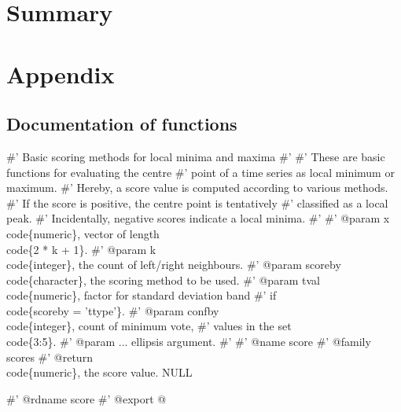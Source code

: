 \documentclass[a4paper]{article}
\begin{document}
\section{Summary}
\label{S4}

\section{Appendix}
\label{S5}

\subsection{Documentation of functions}
\label{S5SS1}

\nwenddocs{}\endmoddef
#' Basic scoring methods for local minima and maxima
#'
#' These are basic functions for evaluating the centre
#' point of a time series as local minimum or maximum.
#' Hereby, a score value is computed according to various methods.
#' If the score is positive, the centre point is tentatively
#' classified as a local peak.
#' Incidentally, negative scores indicate a local minima.
#'
#' @param x \\code\{numeric\}, vector of length \\code\{2 * k + 1\}.
#' @param k \\code\{integer\}, the count of left/right neighbours.
#' @param scoreby \\code\{character\}, the scoring method to be used.
#' @param tval \\code\{numeric\}, factor for standard deviation band
#' if \\code\{scoreby = 'ttype'\}.
#' @param confby \\code\{integer\}, count of minimum vote,
#' values in the set \\code\{3:5\}.
#' @param ... ellipsis argument.
#'
#' @name score
#' @family scores
#' @return \\code\{numeric\}, the score value.
NULL

#' @rdname score
#' @export
\nwendcode{}@
\end{document}
